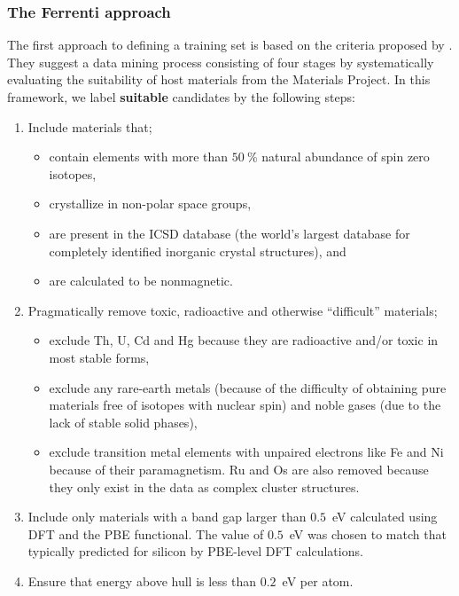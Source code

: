 \documentclass[superscriptaddress,unsortedaddress,
 amsmath,amssymb,
 aps,
]{revtex4-2}
\begin{document}
\subsubsection*{The Ferrenti approach}
The first approach to defining a training set is based on the criteria proposed by \citeauthor{Ferrenti2020} \cite{Ferrenti2020}.
They suggest a data mining process consisting of four stages by systematically evaluating the suitability of host materials from the Materials Project. In this framework, we label \textbf{suitable} candidates by the following steps:
\begin{enumerate}
    \item Include materials that;
    \begin{itemize}
        \item contain elements with more than $50 \ \%$ natural abundance of spin zero  isotopes,
        \item crystallize in non-polar space groups,
        \item are present in the ICSD database (the world's largest database for completely identified inorganic crystal structures), and
        \item are calculated to be nonmagnetic. 
    \end{itemize}
    \item Pragmatically remove toxic, radioactive and otherwise ``difficult'' materials;
    \begin{itemize}
        \item exclude Th, U, Cd and Hg because they are radioactive and/or toxic in most stable forms,
        \item exclude any rare-earth metals (because of the difficulty of obtaining pure materials free of isotopes with nuclear spin) and noble gases (due to the lack of stable solid phases),
        \item exclude transition metal elements with unpaired electrons like Fe and Ni because of their paramagnetism. Ru and Os are also removed because they only exist in the data as complex cluster structures. 
    \end{itemize}
    \item Include only materials with a band gap larger than $0.5$~eV calculated using DFT and the PBE functional. The value of $0.5$~eV was chosen to match that typically predicted for silicon by PBE-level DFT calculations. 
    \item Ensure that energy above hull is less than $0.2$~eV per atom.
\end{enumerate}
\end{document}
